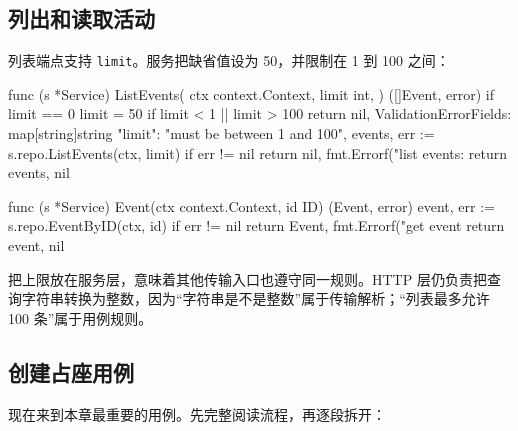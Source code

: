 \subsection{列出和读取活动}

列表端点支持 \texttt{limit}。服务把缺省值设为 50，并限制在 1 到 100 之间：

\begin{gocode}[title={代码清单 12.19 \texttt{service.go}：列出与读取活动}]
func (s *Service) ListEvents(
    ctx context.Context,
    limit int,
) ([]Event, error) {
    if limit == 0 {
        limit = 50
    }
    if limit < 1 || limit > 100 {
        return nil, ValidationError{Fields: map[string]string{
            "limit": "must be between 1 and 100",
        }}
    }
    events, err := s.repo.ListEvents(ctx, limit)
    if err != nil {
        return nil, fmt.Errorf("list events: %
    }
    return events, nil
}

func (s *Service) Event(ctx context.Context, id ID) (Event, error) {
    event, err := s.repo.EventByID(ctx, id)
    if err != nil {
        return Event{}, fmt.Errorf("get event %
    }
    return event, nil
}
\end{gocode}

把上限放在服务层，意味着其他传输入口也遵守同一规则。HTTP 层仍负责把查询字符串转换为整数，因为“字符串是不是整数”属于传输解析；“列表最多允许 100 条”属于用例规则。

\subsection{创建占座用例}

现在来到本章最重要的用例。先完整阅读流程，再逐段拆开：

